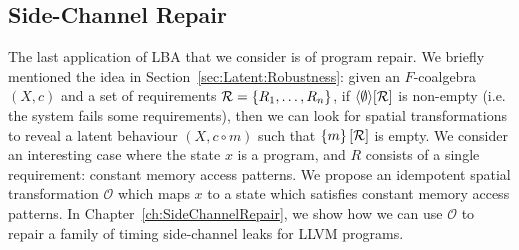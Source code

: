 \subsection{Side-Channel Repair}
The last application of LBA that we consider is of program repair. We briefly mentioned the idea in Section~\ref{sec:Latent:Robustness}: given an $F$-coalgebra $(X,c)$ and a set of requirements $\mathcal{R}=\left\{R_1, \ldots, R_n\right\}$, if ${{\left<\emptyset\right>}}[\mathcal{R}]$ is non-empty (i.e. the system fails some requirements), then we can look for spatial transformations to reveal a latent behaviour $(X,c\circ m)$ such that $\left\{m\right\}[\mathcal{R}]$ is empty. We consider an interesting case where the state $x$ is a program, and $R$ consists of a single requirement: constant memory access patterns. We propose an idempotent spatial transformation $\mathcal{O}$ which maps $x$ to a state which satisfies constant memory access patterns. In Chapter~\ref{ch:SideChannelRepair}, we show how we can use $\mathcal{O}$ to repair a family of timing side-channel leaks for LLVM programs.





